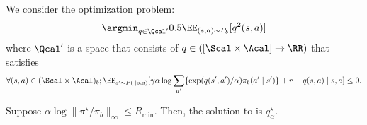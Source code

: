 We consider the optimization problem: 
\begin{align}\label{eq:convex2}
    \argmin_{q \in \Qcal'} 0.5 \EE_{(s,a)\sim P_b}[q^2(s,a)]
\end{align} 
 where $\Qcal'$ is a space that consists of $q\in ([\Scal \times \Acal]\to \RR)$ that satisfies
 \begin{align}\label{eq:constraint12}
  \forall (s,a)\in (\Scal \times \Acal)_b;  \EE_{s'\sim P(\cdot\mid s,a)}[\gamma \alpha \log \sum_{a'}\{\exp(q(s',a')/\alpha) \pi_b(a'\mid s')\}+r-q(s,a) \mid s,a ]\leq 0. 
\end{align}

\begin{lemma}
Suppose $\alpha \log \|\pi^{\star}/\pi_b\|_{\infty} \leq R_{\min}$. Then, the solution to  is $q^{\star}_{\alpha}$.  
\end{lemma}


